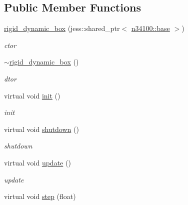 \subsection*{Public Member Functions}
\begin{DoxyCompactItemize}
\item 
\hyperlink{classnebula_1_1content_1_1actor_1_1physics_1_1rigid__dynamic__box_aa9eb669bb8d96607c10da5b73ccfc3a8}{rigid\_\-dynamic\_\-box} (jess::shared\_\-ptr$<$ \hyperlink{classnebula_1_1content_1_1actor_1_1admin_1_1base}{n34100::base} $>$)
\begin{DoxyCompactList}\small\item\em ctor \item\end{DoxyCompactList}\item 
\hyperlink{classnebula_1_1content_1_1actor_1_1physics_1_1rigid__dynamic__box_a9c5f1f870a18f992cde29294f34f3303}{$\sim$rigid\_\-dynamic\_\-box} ()
\begin{DoxyCompactList}\small\item\em dtor \item\end{DoxyCompactList}\item 
virtual void \hyperlink{classnebula_1_1content_1_1actor_1_1physics_1_1rigid__dynamic__box_a235e20a7e695a39c7ccb0100b90c10ee}{init} ()
\begin{DoxyCompactList}\small\item\em init \item\end{DoxyCompactList}\item 
virtual void \hyperlink{classnebula_1_1content_1_1actor_1_1physics_1_1rigid__dynamic__box_a3f9abbce238ad6bee7363ab9a849512c}{shutdown} ()
\begin{DoxyCompactList}\small\item\em shutdown \item\end{DoxyCompactList}\item 
virtual void \hyperlink{classnebula_1_1content_1_1actor_1_1physics_1_1rigid__dynamic__box_ac3f90a5c975d090930fb77f5961e7064}{update} ()
\begin{DoxyCompactList}\small\item\em update \item\end{DoxyCompactList}\item 
virtual void \hyperlink{classnebula_1_1content_1_1actor_1_1physics_1_1rigid__dynamic__box_a849dd1aec8bf8be223dc3d7d9c1f81b5}{step} (float)

\end{DoxyCompactItemize}
